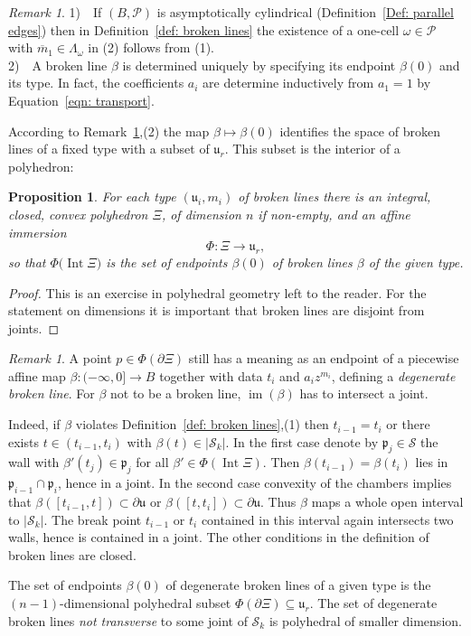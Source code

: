 \documentclass[11pt,letter]{amsart}
\newtheorem{proposition}[theorem]{Proposition}
\theoremstyle{definition}
\theoremstyle{remark}
\newtheorem{remark}[theorem]{Remark}
\numberwithin{equation}{section}
\numberwithin{figure}{section}
\newcommand {\fop}  {\mathfrak{p}}
\newcommand {\fou}  {\mathfrak{u}}
\newcommand {\im}  {\operatorname{im}}
\newcommand {\Int}  {\operatorname{Int}}
\newcommand {\lra}  {\longrightarrow}
\renewcommand{\P}  {\mathscr{P}}
\newcommand {\scrS}  {\mathscr{S}}
\begin{document}
\begin{remark}
\label{rem: broken lines}
1)\ \ If $(B,\P)$ is asymptotically cylindrical (Definition~\ref{Def: parallel
edges}) then in Definition~\ref{def: broken lines} the existence of a one-cell
$\omega\in\P$ with $\overline m_1\in\Lambda_\omega$ in (2) follows from
(1).\\[1ex]
2)\ \ A broken line $\beta$ is determined uniquely by specifying its endpoint
$\beta(0)$ and its type. In fact, the coefficients $a_i$ are determine
inductively from $a_1=1$ by Equation~\eqref{eqn: transport}. 
\end{remark}

According to Remark~\ref{rem: broken lines},(2) the map $\beta\mapsto \beta(0)$
identifies the space of broken lines of a fixed type with a subset of $\fou_r$.
This subset is the interior of a polyhedron:

\begin{proposition}
\label{prop: broken line moduli polyhedral}
For each type $(\fou_i,m_i)$ of broken lines there is an integral, closed,
convex polyhedron $\Xi$, of dimension $n$ if non-empty, and an affine immersion
\[
\Phi: \Xi\lra \fou_r,
\]
so that $\Phi\big (\Int\Xi\big)$ is the set of endpoints $\beta(0)$ of broken
lines $\beta$ of the given type.
\end{proposition}

\begin{proof}
This is an exercise in polyhedral geometry left to the reader. For the statement
on dimensions it is important that broken lines are disjoint from joints.
\end{proof}

\begin{remark}
\label{degenerate broken lines}
A point $p\in \Phi(\partial \Xi)$ still has a meaning as an endpoint of a
piecewise affine map $\beta:(-\infty,0]\to B$ together with data $t_i$ and $a_i
z^{m_i}$, defining a \emph{degenerate broken line}. For $\beta$ not to be a
broken line, $\im(\beta)$ has to intersect a joint.

Indeed, if $\beta$ violates Definition~\ref{def: broken lines},(1) then
$t_{i-1}=t_i$ or there exists $t\in (t_{i-1},t_i)$ with $\beta(t)\in|\scrS_k|$.
In the first case denote by $\fop_j\in\scrS$ the wall with
$\beta'(t_j)\in\fop_j$ for all $\beta'\in \Phi(\Int\Xi)$. Then
$\beta(t_{i-1})=\beta(t_i)$ lies in $\fop_{i-1}\cap\fop_i$, hence in a joint.
In the second case convexity of the chambers implies that
$\beta([t_{i-1},t])\subset\partial \fou$ or $\beta([t,t_i])\subset\partial
\fou$. Thus $\beta$ maps a whole open interval to $|\scrS_k|$. The break
point $t_{i-1}$ or $t_i$ contained in this interval again intersects two
walls, hence is contained in a joint. The other conditions in the definition of
broken lines are closed.

The set of endpoints $\beta(0)$ of degenerate broken lines of a given type is
the $(n-1)$-dimensional polyhedral subset $\Phi(\partial\Xi)\subseteq \fou_r$.
The set of degenerate broken lines \emph{not transverse} to some joint of
$\scrS_k$ is polyhedral of smaller dimension.
\end{remark}
\end{document}
